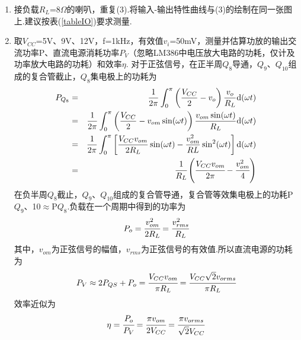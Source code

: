 \documentclass[a4paper]{article}
\begin{document}
\begin{enumerate}
\begin{enumerate}
\item 接负载$R_L$=8$\Omega$的喇叭，重复(3).将输入-输出特性曲线与(3)的绘制在同一张图上.建议按表(\ref{tableIO})要求测量.
\item 取$V_{CC}$=5V、9V、12V，f=1kHz，有效值$v_i$=50mV，测量并估算功放的输出交流功率P、直流电源消耗功率$P_V$（忽略LM386中电压放大电路的功耗，仅计及功率放大电路的功耗）和效率$\eta$.
对于正弦信号，在正半周$Q_8$导通，$Q_9$、$Q_{10}$组成的复合管截止，$Q_8$集电极上的功耗为
\begin{eqnarray}
P_{Q_8}
 &=& \frac{1}{2\pi}\int^{\pi}_{0}\left(\frac{V_{CC}}{2} - v_o\right)\frac{v_o}{R_L}\text{d}(\omega t)\\
 &=& \frac{1}{2\pi}\int^{\pi}_{0}\left(\frac{V_{CC}}{2} - v_{om}\sin(\omega t)\right)\frac{v_{om}\sin(\omega t)}{R_L}\text{d}(\omega t)\\
 &=& \frac{1}{2\pi}\int^{\pi}_{0}\left[\frac{V_{CC}v_{om}}{2R_L}\sin(\omega t) - \frac{v_{om}^2}{RL}\sin^2(\omega t)\right]\text{d}(\omega t)\\
 &=& \cfrac{1}{R_L}\left(\cfrac{V_{CC}v_{om}}{2\pi} - \cfrac{v_{om}^2}{4}\right)
\end{eqnarray}
在负半周$Q_8$截止，$Q_9$、$Q_{10}$组成的复合管导通，复合管等效集电极上的功耗P$Q_9$、10$\approx$P$Q_8$.负载在一个周期中得到的功率为
\begin{equation}
P_o = \cfrac{v^2_{om}}{2R_L} = \cfrac{v_{rms}^2}{R_L}
\end{equation}
其中，$v_{om}$为正弦信号的幅值，$v_{rms}$为正弦信号的有效值.所以直流电源的功耗为
\begin{equation}
P_V \approx 2P_{QS}+P_o = \cfrac{V_{CC}v_{om}}{\pi R_L} = \cfrac{V_{CC}\sqrt{2}v_{orms}}{\pi R_L}
\end{equation}
效率近似为
\begin{equation}
\eta = \cfrac{P_o}{P_V} = \cfrac{\pi v_{om}}{2V_{CC}} = \cfrac{\pi v_{orms}}{\sqrt{2}V_{CC}}\label{eta}
\end{equation}
\end{enumerate}
\end{enumerate}
\end{document}
